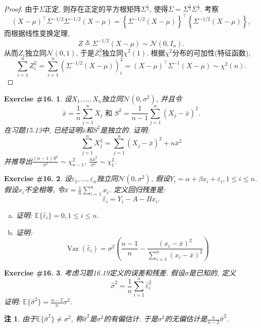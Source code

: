 \documentclass[UTF8, a4paper]{article}
\newtheorem{exercise}{Exercise \#16.}
\newtheorem*{remark}{注}
\begin{document}
\begin{proof}
由于\(\Sigma\)正定, 则存在正定的平方根矩阵\(\Sigma^{\frac{1}{2}}\), 使得\(\Sigma = \Sigma^{\frac{1}{2}}\Sigma^{\frac{1}{2}}\).
考察 
$$
(X-\mu)^\top \Sigma^{-1/2} \Sigma^{-1/2}(X-\mu) = \left\{\Sigma^{-1/2}(X-\mu)\right\}^\top \left\{\Sigma^{-1/2}(X-\mu)\right\} ,
$$
而根据线性变换定理, 
$$
Z\triangleq \Sigma^{-1/2}(X-\mu) \sim \mathcal{N}(0, I_n).
$$
从而\(Z_i\)独立同\(\mathcal{N}(0, 1)\), 于是\(Z_i^2\)独立同\(\chi^2(1)\).
根据\(\chi^2\)分布的可加性(特征函数), 
$$
\sum_{i=1}^{n}Z_i^2 = \sum_{i=1}^{n}\left(\Sigma^{-1/2}(X-\mu)\right)_i^2 = (X-\mu)^\top \Sigma^{-1}(X-\mu) \sim \chi^2(n).
$$
\end{proof}



\begin{exercise}
设\(X_1, ..., X_n\)独立同\(\mathcal{N}(0, \sigma^2)\), 并且令
$$
\bar{x}=\frac{1}{n} \sum_{j=1}^n X_j \text { 和 } S^2=\frac{1}{n-1} \sum_{j=1}^n\left(X_j-\bar{x}\right)^2 .
$$
在习题15.13中, 已经证明\(\bar{x}\)和\(S^2\)是独立的.
证明: $$
\sum_{j=1}^n X_j^2=\sum_{j=1}^n\left(X_j-\bar{x}\right)^2+n \bar{x}^2
$$
并推导出\(\frac{(n-1)S^2}{\sigma^2}\sim \chi_{n-1}^2\), \(\frac{n \bar{x}^2}{\sigma^2} \sim \chi_1^2\).
\end{exercise}


\begin{exercise}
设\(\varepsilon_1,...,\varepsilon_n\)独立同\(\mathcal{N}(0, \sigma^2)\), 假设\(Y_i =  \alpha + \beta x_i + \varepsilon_i, 1 \leq i \leq n\).
假设\(x_i\)不全相等, 令\(\bar{x} = \frac{1}{n}\sum_{i = 1}^n x_i\).
定义回归残差是:
$$
\hat{\varepsilon}_i=Y_i-A-B x_i.
$$
\begin{enumerate}[a)]
    \item 证明: \(\mathbb{E}\{\hat{\varepsilon}_i\} = 0, 1\leq i\leq n\).
    \item 证明: $$
\operatorname{Var}\left(\hat{\varepsilon}_i\right)=\sigma^2\left(\frac{n-1}{n}-\frac{\left(x_i-\bar{x}\right)^2}{\sum_{i=1}^n\left(x_i-\bar{x}\right)^2}\right)
$$
\end{enumerate}
\end{exercise}

\begin{exercise}
考虑习题16.19定义的误差和残差. 假设\(\sigma\)是已知的, 定义
$$
\hat{\sigma}^2=\frac{1}{n} \sum_{i=1}^n \hat{\varepsilon}_i^2
$$
证明: \(\mathbb{E}\{\hat{\sigma}^2\} = \frac{n-2}{n}\sigma^2\).
\end{exercise}
\begin{remark}
由于\(\mathbb{E}\{\hat{\sigma}^2\} \neq \sigma^2\), 称\(\hat{\sigma}^2\)是\(\sigma^2\)的有偏估计.
于是\(\sigma^2\)的无偏估计是\(\frac{n}{n-2}\hat{\sigma}^2\).
\end{remark}
\end{document}
